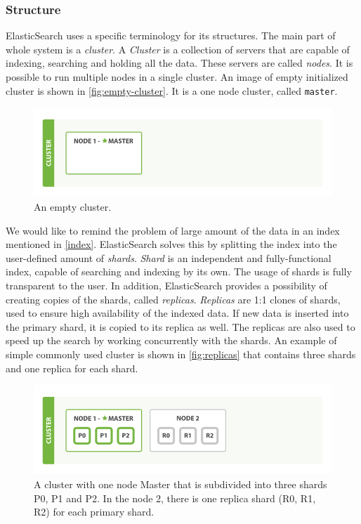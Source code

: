 \subsubsection{Structure}
ElasticSearch uses a specific terminology for its structures. The main part of whole system is a \emph{cluster}. A \emph{Cluster} is a collection of servers that are capable of indexing, searching and holding all the data. These servers are called \emph{nodes}. It is possible to run multiple nodes in a single cluster. An image of empty initialized cluster is shown in \autoref{fig:empty-cluster}. It is a one node cluster, called \texttt{master}.
\begin{figure}
\centering
\includegraphics[width=.8\textwidth]{img/empty_cluster.png}
\caption{An empty cluster.}
\label{fig:empty-cluster}
\end{figure}

We would like to remind the problem of large amount of the data in an index mentioned in \autoref{index}. ElasticSearch solves this by splitting the index into the user-defined amount of \emph{shards}. \emph{Shard} is an independent and fully-functional index, capable of searching and indexing by its own.
The usage of shards is fully transparent to the user. In addition, ElasticSearch provides a possibility of creating copies of the shards, called \emph{replicas}. \emph{Replicas} are 1:1 clones of shards, used to ensure high availability of the indexed data. If new data is inserted into the primary shard, it is copied to its replica as well.
The replicas are also used to speed up the search by working concurrently with the shards.
An example of simple commonly used cluster is shown in \autoref{fig:replicas} that contains three shards and one replica for each shard.
\begin{figure}
\centering
\includegraphics[width=.8\textwidth]{img/replicas.png}
\caption{A cluster with one node Master that is subdivided into three shards P0, P1 and P2. In the node 2, there is one replica shard (R0, R1, R2) for each primary shard.}
\label{fig:replicas}
\end{figure}

